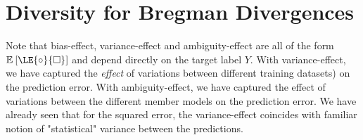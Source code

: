 \documentclass[../main.tex]{subfiles}
\begin{document}
\section{Diversity for Bregman Divergences} \label{sec:bregman-divergences}




Note that bias-effect, variance-effect and ambiguity-effect are all of the form $\mathbb{E}_{}\left[ \LE{\circ}{\square} \right]$ and depend directly on the target label $Y$. 
With variance-effect, we have captured the \textit{effect} of variations between different training datasets) on the prediction error.
With ambiguity-effect, we have captured the effect of variations between the different member models on the prediction error.
We have already seen that for the squared error, the variance-effect coincides with familiar notion of "statistical" variance between the predictions.
\end{document}
